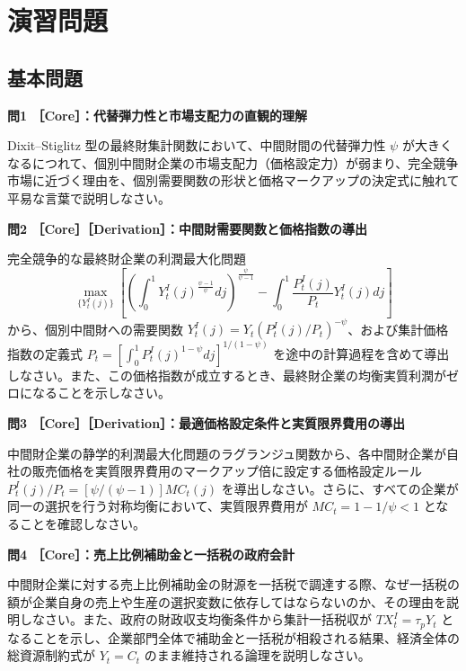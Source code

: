 \documentclass[
  japanese,
  lualatex,
  ja=standard,
  12pt,
  a4paper]{ltjsarticle}
\begin{document}
\Needspace{0.45\textheight}

\section{演習問題}\label{ux6f14ux7fd2ux554fux984c}

\subsection{基本問題}\label{ux57faux672cux554fux984c}

\textbf{問1 ［Core］：代替弾力性と市場支配力の直観的理解}

Dixit--Stiglitz 型の最終財集計関数において、中間財間の代替弾力性
\(\psi\)
が大きくなるにつれて、個別中間財企業の市場支配力（価格設定力）が弱まり、完全競争市場に近づく理由を、個別需要関数の形状と価格マークアップの決定式に触れて平易な言葉で説明しなさい。

\textbf{問2 ［Core］［Derivation］：中間財需要関数と価格指数の導出}

完全競争的な最終財企業の利潤最大化問題 \[
\max_{\{Y_t^I(j)\}} \left[ \left( \int_0^1 Y_t^I(j)^{\frac{\psi-1}{\psi}} dj \right)^{\frac{\psi}{\psi-1}} - \int_0^1 \frac{P_t^I(j)}{P_t} Y_t^I(j) dj \right]
\] から、個別中間財への需要関数
\(Y_t^I(j) = Y_t (P_t^I(j)/P_t)^{-\psi}\)、および集計価格指数の定義式
\(P_t = [\int_0^1 P_t^I(j)^{1-\psi} dj]^{1/(1-\psi)}\)
を途中の計算過程を含めて導出しなさい。また、この価格指数が成立するとき、最終財企業の均衡実質利潤がゼロになることを示しなさい。

\textbf{問3
［Core］［Derivation］：最適価格設定条件と実質限界費用の導出}

中間財企業の静学的利潤最大化問題のラグランジュ関数から、各中間財企業が自社の販売価格を実質限界費用のマークアップ倍に設定する価格設定ルール
\(P_t^I(j)/P_t = [\psi/(\psi-1)]MC_t(j)\)
を導出しなさい。さらに、すべての企業が同一の選択を行う対称均衡において、実質限界費用が
\(MC_t = 1 - 1/\psi < 1\) となることを確認しなさい。


\textbf{問4 ［Core］：売上比例補助金と一括税の政府会計}

中間財企業に対する売上比例補助金の財源を一括税で調達する際、なぜ一括税の額が企業自身の売上や生産の選択変数に依存してはならないのか、その理由を説明しなさい。また、政府の財政収支均衡条件から集計一括税収が
\(TX_t^I = \tau_p Y_t\)
となることを示し、企業部門全体で補助金と一括税が相殺される結果、経済全体の総資源制約式が
\(Y_t = C_t\) のまま維持される論理を説明しなさい。
\end{document}

